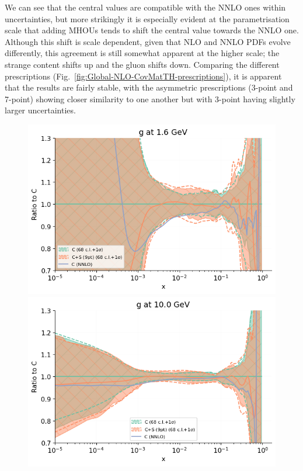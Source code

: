 We can see that the central values are compatible with the NNLO ones within uncertainties, but more strikingly it is especially evident at the parametrisation scale that adding MHOUs tends to shift the central value towards the NNLO one. Although this shift is scale dependent, given that NLO and NNLO PDFs evolve differently, this agreement is still somewhat apparent at the higher scale; the strange content shifts up and the gluon shifts down. 
%
Comparing the different prescriptions (Fig.~\ref{fig:Global-NLO-CovMatTH-prescriptions}), it is apparent that the results are fairly stable, with the asymmetric prescriptions (3-point and 7-point) showing closer similarity to one another but with 3-point having slightly larger uncertainties.
\begin{figure}[H]
  \begin{center}
       \includegraphics[scale=0.45]{mhous/plots/jplots/pdfscalespecs0_basespecs0_pdfnormalize0_plot_pdfs_g.png}
    \includegraphics[scale=0.45]{mhous/plots/jplots/pdfscalespecs0_basespecs0_pdfnormalize0_plot_pdfs_g2.png}

\end{center}
\end{figure}
